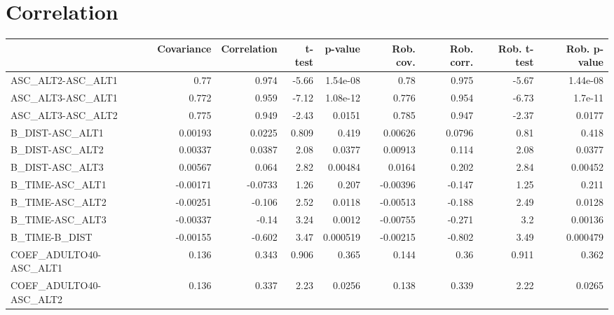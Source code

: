 \section{Correlation}
\begin{tabular}{lrrrrrrrr}
\toprule
{} &  Covariance &  Correlation &  t-test &  p-value &  Rob. cov. &  Rob. corr. &  Rob. t-test &  Rob. p-value \\
\midrule
ASC\_ALT2-ASC\_ALT1                 &        0.77 &        0.974 &   -5.66 & 1.54e-08 &       0.78 &       0.975 &        -5.67 &      1.44e-08 \\
ASC\_ALT3-ASC\_ALT1                 &       0.772 &        0.959 &   -7.12 & 1.08e-12 &      0.776 &       0.954 &        -6.73 &       1.7e-11 \\
ASC\_ALT3-ASC\_ALT2                 &       0.775 &        0.949 &   -2.43 &   0.0151 &      0.785 &       0.947 &        -2.37 &        0.0177 \\
B\_DIST-ASC\_ALT1                   &     0.00193 &       0.0225 &   0.809 &    0.419 &    0.00626 &      0.0796 &         0.81 &         0.418 \\
B\_DIST-ASC\_ALT2                   &     0.00337 &       0.0387 &    2.08 &   0.0377 &    0.00913 &       0.114 &         2.08 &        0.0377 \\
B\_DIST-ASC\_ALT3                   &     0.00567 &        0.064 &    2.82 &  0.00484 &     0.0164 &       0.202 &         2.84 &       0.00452 \\
B\_TIME-ASC\_ALT1                   &    -0.00171 &      -0.0733 &    1.26 &    0.207 &   -0.00396 &      -0.147 &         1.25 &         0.211 \\
B\_TIME-ASC\_ALT2                   &    -0.00251 &       -0.106 &    2.52 &   0.0118 &   -0.00513 &      -0.188 &         2.49 &        0.0128 \\
B\_TIME-ASC\_ALT3                   &    -0.00337 &        -0.14 &    3.24 &   0.0012 &   -0.00755 &      -0.271 &          3.2 &       0.00136 \\
B\_TIME-B\_DIST                     &    -0.00155 &       -0.602 &    3.47 & 0.000519 &   -0.00215 &      -0.802 &         3.49 &      0.000479 \\
COEF\_ADULTO40-ASC\_ALT1            &       0.136 &        0.343 &   0.906 &    0.365 &      0.144 &        0.36 &        0.911 &         0.362 \\
COEF\_ADULTO40-ASC\_ALT2            &       0.136 &        0.337 &    2.23 &   0.0256 &      0.138 &       0.339 &         2.22 &        0.0265 \\

\end{tabular}
